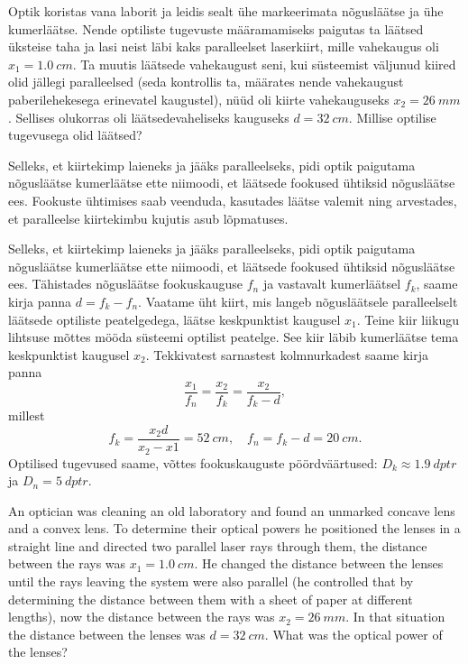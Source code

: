 
Optik koristas vana laborit ja leidis sealt ühe markeerimata nõgusläätse ja ühe
kumerläätse. Nende optiliste tugevuste määramamiseks paigutas ta läätsed
üksteise taha ja lasi neist läbi kaks paralleelset laserkiirt, mille vahekaugus
oli $x_{1}=\SI{1,0}{cm}$. Ta muutis läätsede vahekaugust seni, kui süsteemist väljunud
kiired olid jällegi paralleelsed (seda kontrollis ta, määrates nende vahekaugust
paberilehekesega erinevatel kaugustel), nüüd oli kiirte vahekauguseks
$x_{2}=\SI{26}{mm}$. Sellises olukorras oli läätsedevaheliseks kauguseks 
$d=\SI{32}{cm}$.
Millise optilise tugevusega olid läätsed?

\hint
Selleks, et kiirtekimp laieneks ja jääks paralleelseks, pidi optik paigutama
nõgusläätse kumerläätse ette niimoodi, et läätsede fookused ühtiksid nõgusläätse
ees. Fookuste ühtimises saab veenduda, kasutades läätse valemit ning arvestades, et paralleelse kiirtekimbu kujutis asub lõpmatuses.

\solu
Selleks, et kiirtekimp laieneks ja jääks paralleelseks, pidi optik paigutama
nõgusläätse kumerläätse ette niimoodi, et läätsede fookused ühtiksid nõgusläätse
ees. Tähistades nõgusläätse fookuskauguse $f_{n}$ ja vastavalt kumerläätsel
$f_{k}$, saame kirja panna $d=f_{k}-f_{n}$. Vaatame üht kiirt, mis langeb
nõgusläätsele paralleelselt läätsede optiliste peatelgedega, läätse keskpunktist
kaugusel $x_{1}$. Teine kiir liikugu lihtsuse mõttes mööda süsteemi optilist
peatelge. See kiir läbib kumerläätse tema keskpunktist kaugusel $x_{2}$.
Tekkivatest sarnastest kolmnurkadest saame kirja panna
\[ \frac{x_{1}}{f_{n}}=\frac{x_{2}}{f_{k}}=\frac{x_{2}}{f_{k}-d}, \] millest
\[ f_{k}=\frac{x_{2}d}{x_{2}-x{1}}=\SI{52}{cm},\quad f_{n}=f_{k}-d=\SI{20}{cm}.\]
Optilised tugevused saame, võttes fookuskauguste pöördväärtused:
$D_{k}\approx\SI{1,9}{dptr}$ ja $D_{n}=\SI{5}{dptr}$.

An optician was cleaning an old laboratory and found an unmarked concave lens and a convex lens. To determine their optical powers he positioned the lenses in a straight line and directed two parallel laser rays through them, the distance between the rays was $x_{1}=\SI{1,0}{cm}$. He changed the distance between the lenses until the rays leaving the system were also parallel (he controlled that by determining the distance between them with a sheet of paper at different lengths), now the distance between the rays was $x_{2}=\SI{26}{mm}$. In that situation the distance between the lenses was $d=\SI{32}{cm}$. What was the optical power of the lenses?

